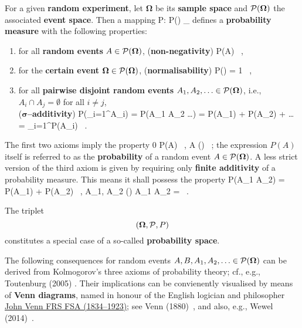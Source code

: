 \medskip
\noindent
For a given \textbf{random experiment}, let $\boldsymbol{\Omega}$
be its \textbf{sample space} and ${\cal P}(\boldsymbol{\Omega})$
the associated \textbf{event space}. Then a mapping
%
\be
P: {\cal P}(\boldsymbol{\Omega}) \rightarrow {}_{}
\ee
%
defines a \textbf{probability measure} with the following
properties:
%
\begin{enumerate}
\item for all \textbf{random events} $A \in {\cal 
P}(\boldsymbol{\Omega})$, 
\hfill (\textbf{non-negativity})
%
\be
{}
P(A)  \ ,
\ee
%

\item for the \textbf{certain event} $\boldsymbol{\Omega} \in 
{\cal P}(\boldsymbol{\Omega})$, \hfill (\textbf{normalisability})
%
\be
{}
P(\boldsymbol{\Omega}) = 1 \ ,
\ee
%

\item for all \textbf{pairwise disjoint random events} $A_{1},
A_{2}, \ldots \in {\cal P}(\boldsymbol{\Omega})$, i.e., $A_{i}
\cap A_{j} = \emptyset$ for all $i \neq j$,\\
\mbox{} \hfill ($\boldsymbol{\sigma}$\textbf{--additivity})
%
\be
{}
P\left(\bigcup_{i=1}^{\infty}A_{i}\right)
= P(A_{1} \cup A_{2} \cup \ldots)
= P(A_{1}) + P(A_{2}) + \ldots
= \sum_{i=1}^{\infty}P(A_{i}) \ .
\ee
%

\end{enumerate}
%
The first two axioms imply the property
%
\be
{}
0 \leq P(A)  \ ,
\quad{}\quad
A (\boldsymbol{\Omega}) \ ;
\ee
%
the expression $P(A)$ itself is referred to as the
\textbf{probability} of a random event $A \in {\cal 
P}(\boldsymbol{\Omega})$. A less strict version of the third axiom
is given by requiring only \textbf{finite additivity} of a
probability measure. This means it shall possess the property
%
\be
P(A_{1} \cup A_{2}) = P(A_{1}) + P(A_{2}) \ ,
\quad{}\quad
A_{1}, A_{2} (\boldsymbol{\Omega})
\quad{}\quad A_{1} \cap A_{2} = \emptyset \ .
\ee
%

\medskip
\noindent
The triplet
%
\[
\left(\boldsymbol{\Omega}, {\cal P}, P\right)
\]
%
constitutes a special case of a so-called \textbf{probability
space}.

\medskip
\noindent
The following consequences for random events $A, B, A_{1}, A_{2}, 
\ldots \in {\cal P}(\boldsymbol{\Omega})$ can be derived from 
Kolmogorov's three axioms of probability theory; cf., e.g., 
Toutenburg (2005) . Their implications can be 
convienently visualised by means of \textbf{Venn diagrams}, 
named in honour of the English logician and philosopher 
\href{http://www-history.mcs.st-and.ac.uk/Biographies/Venn.html}{John
Venn FRS FSA (1834--1923)}; see Venn (1880)~, and also,
e.g., Wewel (2014)~.

